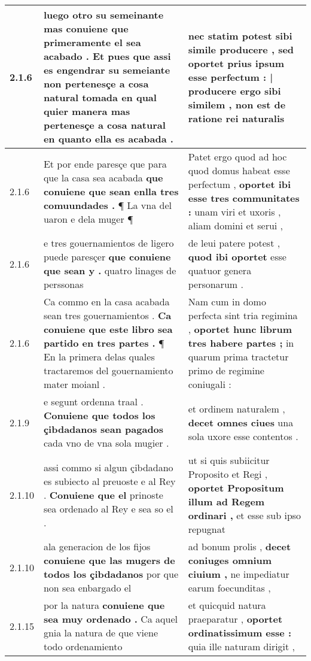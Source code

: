\begin{tabular}{|p{1cm}|p{6.5cm}|p{6.5cm}|}
2.1.6 & luego otro su semeinante \textbf{ mas conuiene que primeramente el sea acabado . } Et pues que assi es engendrar su semeiante non pertenesçe a cosa natural tomada en qual quier manera mas pertenesçe a cosa natural en quanto ella es acabada . & nec statim potest sibi simile producere , \textbf{ sed oportet prius ipsum esse perfectum : | producere ergo sibi similem , } non est de ratione rei naturalis \\\hline
2.1.6 & Et por ende paresçe que para que la casa sea acabada \textbf{ que conuiene que sean enlla tres comuundades . } ¶ La vna del uaron e dela muger ¶ & Patet ergo quod ad hoc quod domus habeat esse perfectum , \textbf{ oportet ibi esse tres communitates : } unam viri et uxoris , aliam domini et serui , \\\hline
2.1.6 & e tres gouernamientos de ligero puede paresçer \textbf{ que conuiene que sean y . } quatro linages de perssonas & de leui patere potest , \textbf{ quod ibi oportet } esse quatuor genera personarum . \\\hline
2.1.6 & Ca commo en la casa acabada sean tres gouernamientos . \textbf{ Ca conuiene que este libro sea partido en tres partes . } ¶ En la primera delas quales tractaremos del gouernamiento mater moianl . & Nam cum in domo perfecta sint tria regimina , \textbf{ oportet hunc librum tres habere partes ; } in quarum prima tractetur primo de regimine coniugali : \\\hline
2.1.9 & e segunt ordenna traal . \textbf{ Conuiene que todos los çibdadanos sean pagados } cada vno de vna sola mugier . & et ordinem naturalem , \textbf{ decet omnes ciues } una sola uxore esse contentos . \\\hline
2.1.10 & assi commo si algun çibdadano es subiecto al preuoste e al Rey . \textbf{ Conuiene que el } prinoste sea ordenado al Rey e sea so el . & ut si quis subiicitur Proposito et Regi , \textbf{ oportet Propositum illum ad Regem ordinari , } et esse sub ipso repugnat \\\hline
2.1.10 & ala generacion de los fijos \textbf{ conuiene que las mugers de todos los çibdadanos } por que non sea enbargado el & ad bonum prolis , \textbf{ decet coniuges omnium ciuium , } ne impediatur earum foecunditas , \\\hline
2.1.15 & por la natura \textbf{ conuiene que sea muy ordenado . } Ca aquel gnia la natura de que viene todo ordenamiento & et quicquid natura praeparatur , \textbf{ oportet ordinatissimum esse : } quia ille naturam dirigit , \\\hline

\end{tabular}
